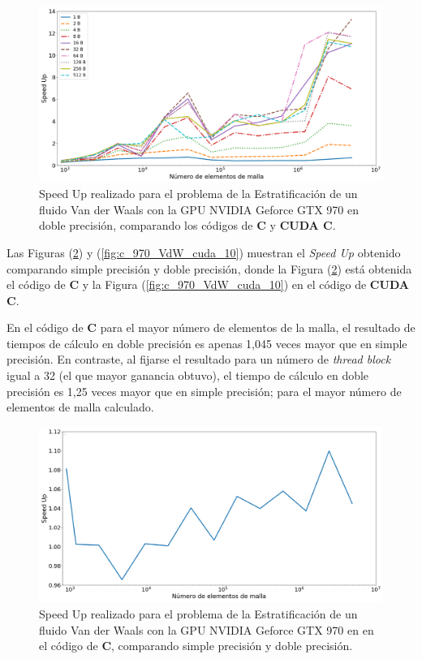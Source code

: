 \begin{figure}[h!]
	\centering
	\includegraphics[width=\textwidth]{figs/cap4/s_970_VdW_double_10}
	\caption{Speed Up realizado para el problema de la Estratificación de un fluido Van der Waals con la GPU NVIDIA Geforce GTX 970 en doble precisión, comparando los códigos de \textbf{C} y \textbf{CUDA C}.} 
	\label{fig:s_970_VdW_double_10}	
\end{figure}

\newpage

Las Figuras (\ref{fig:c_970_VdW_c_10}) y (\ref{fig:c_970_VdW_cuda_10}) muestran el \textit{Speed Up} obtenido comparando simple precisión y doble precisión, donde la Figura (\ref{fig:c_970_VdW_c_10}) está obtenida el código de \textbf{C} y la Figura (\ref{fig:c_970_VdW_cuda_10}) en el código de \textbf{CUDA C}. 

En el código de \textbf{C} para el mayor número de elementos de la malla, el resultado de tiempos de cálculo en doble precisión es apenas 1,045 veces mayor que en  simple precisión. En contraste, al fijarse el resultado para un número de \textit{thread block} igual a 32 (el que mayor ganancia obtuvo), el tiempo de cálculo en doble precisión es 1,25 veces mayor que en simple precisión; para el mayor número de elementos de malla calculado.

\begin{figure}[h!]
	\centering
	\includegraphics[width=\textwidth]{figs/cap4/c_970_VdW_c_10}
	\caption{Speed Up realizado para el problema de la Estratificación de un fluido Van der Waals con la GPU NVIDIA Geforce GTX 970 en en el código de \textbf{C}, comparando simple precisión y doble precisión.} 
	\label{fig:c_970_VdW_c_10}	
\end{figure}

